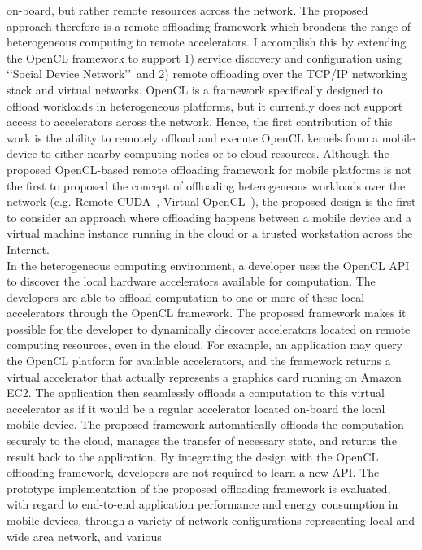 on-board, but rather remote resources across the network.
%
The proposed approach therefore is a remote offloading framework which
broadens the range of heterogeneous computing to remote accelerators.
%
I accomplish this by extending the OpenCL framework to support 1)
service discovery and configuration using \lq\lq Social Device
Network\rq\rq\  and 2) remote offloading over the TCP/IP networking stack
and virtual networks.
%
OpenCL is a framework specifically designed to offload workloads in
heterogeneous platforms, but it currently does not support access to
accelerators across the network.
%
Hence, the first contribution of this work is the ability to remotely
offload and execute OpenCL kernels from a mobile device to either nearby
computing nodes or to cloud resources.
%
Although the proposed OpenCL-based remote offloading framework for mobile
platforms is not the first to proposed the concept of offloading
heterogeneous workloads over the network (e.g. Remote CUDA~\cite{rcuda},
Virtual OpenCL~\cite{vocl}), the proposed design is the first to
consider an approach where offloading happens between a mobile device and a virtual
machine instance running in the cloud or a trusted workstation across
the Internet.\\
%
In the heterogeneous computing environment, a developer uses the OpenCL
API to discover the local hardware accelerators available for
computation.
%
The developers are able to offload computation to one or more of these
local accelerators through the OpenCL framework.
%
The proposed framework makes it possible for the developer to
dynamically discover accelerators located on remote computing resources,
even in the cloud.
%
For example, an application may query the OpenCL platform for available
accelerators, and the framework returns a virtual accelerator that
actually represents a graphics card running on Amazon EC2.
%
The application then seamlessly offloads a computation to this virtual
accelerator as if it would be a regular accelerator located on-board
the local mobile device.
%
The proposed framework automatically offloads the computation securely
to the cloud, manages the transfer of necessary state, and returns the
result back to the application.
%
By integrating the design with the OpenCL offloading framework,
developers are not required to learn a new API.
%
The prototype implementation of the proposed offloading framework is evaluated,
with regard to end-to-end application performance and energy
consumption in mobile devices, through a variety of network
configurations representing local and wide area network, and various
